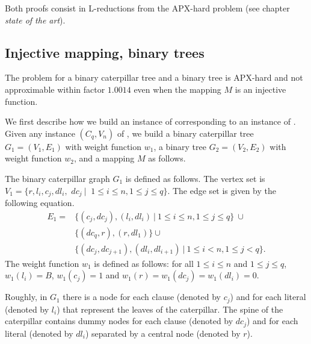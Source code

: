 		Both proofs consist in L-reductions from the APX-hard \msat{} problem (see chapter \emph{state of the art}).


		\subsection{Injective mapping, binary trees}
		\label{subsec:apx-bt-cater}

		\begin{proposition}\label{prop:apx-bt-cater}
			The \mwccs{} problem for a binary caterpillar tree and a binary tree is APX-hard and not approximable within factor $1.0014$ even when the mapping $M$ is an injective function.%
		\end{proposition}

		We first describe how we build an instance of \mwccs{} corresponding to an instance of \msat{}. Given any instance $(C_q,V_n)$ of \msat{}, we build a binary caterpillar tree $G_1=(V_1,E_1)$ with weight function $w_1$, a binary tree $G_2=(V_2,E_2)$ with weight function $w_2$, and a mapping $M$ as follows.

		The binary caterpillar graph $G_1$ is defined as follows. The vertex set is $V_1=\{r, l_i, c_j, dl_i, $ $dc_j ~\vert~$ $ 1\leq i\leq n, 1\leq j \leq q\}$. The edge set is given by the following equation.
		\begin{align*}
		E_1= &\{(c_j,dc_j), (l_i,dl_i) ~\vert~ 1\leq i\leq n, 1\leq j \leq q\}~\cup \\
		&\{(dc_q,r), (r,dl_1)\} \cup \\
		& \{(dc_j,dc_{j+1}), (dl_i,dl_{i+1}) ~\vert~ 1\leq i< n, 1\leq j < q\}.
		\end{align*}
		The weight function $w_1$ is defined as follows: for all $1 \leq i\leq n$ and $1\leq j \leq q$, $w_1(l_i)=B$, $w_1(c_j)=1$ and $w_1(r)=w_1(dc_j)=w_1(dl_i)=0$.

		Roughly, in $G_1$ there is a node for each clause (denoted by $c_j$) and for each literal (denoted by $l_i$) that represent the leaves of the caterpillar. The spine of the caterpillar contains dummy nodes for each clause (denoted by $dc_j$) and for each literal (denoted by $dl_i$) separated by a central node (denoted by $r$).

